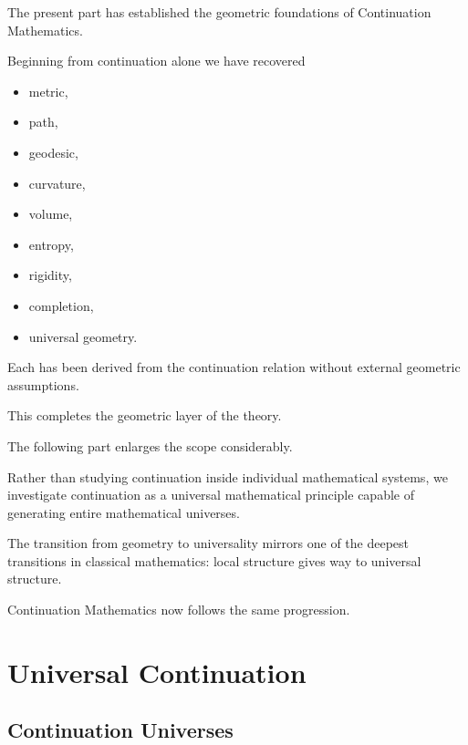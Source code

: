 \documentclass[13pt,openany]{book}
\theoremstyle{plain}
\theoremstyle{definition}
\begin{document}
The present part has established the geometric foundations of Continuation Mathematics.

Beginning from continuation alone we have recovered

\begin{itemize}

\item metric,

\item path,

\item geodesic,

\item curvature,

\item volume,

\item entropy,

\item rigidity,

\item completion,

\item universal geometry.

\end{itemize}

Each has been derived from the continuation relation without external geometric assumptions.

This completes the geometric layer of the theory.

The following part enlarges the scope considerably.

Rather than studying continuation inside individual mathematical systems, we investigate continuation as a universal mathematical principle capable of generating entire mathematical universes.

The transition from geometry to universality mirrors one of the deepest transitions in classical mathematics: local structure gives way to universal structure.

Continuation Mathematics now follows the same progression.




\part{Universal Continuation}

\chapter{Continuation Universes}
\end{document}
